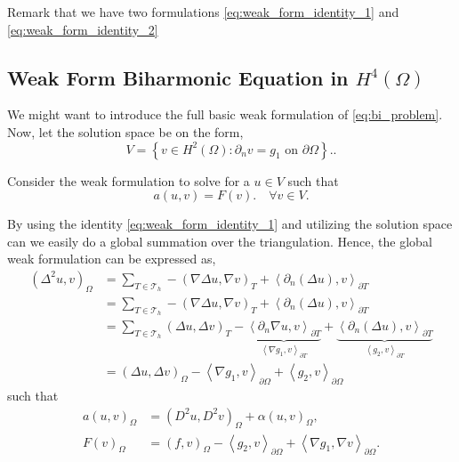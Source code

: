 Remark that we have two formulations \eqref{eq:weak_form_identity_1} and \eqref{eq:weak_form_identity_2}
\subsection{  Weak Form Biharmonic Equation in $H^{4}\left( \Omega  \right) $}%
\label{sub:continious_weak_form_of_biharmonic_equation}

We might want to introduce the full basic weak formulation of \eqref{eq:bi_problem}. Now, let the solution space be on the form,
\begin{equation*}
V = \left\{ v \in H^2\left( \Omega  \right) : \partial _{n} v = g_{1}  \text{ on }
\partial \Omega  \right\}.
.\end{equation*}

Consider the weak formulation to solve for a $u \in  V$ such that
\begin{equation}
    \label{eq:bi_weak1}
a\left( u,v \right) = F(v).\quad \forall v \in
V.
\end{equation}

By using the identity \eqref{eq:weak_form_identity_1} and utilizing the solution space can we easily do a global summation over the triangulation. Hence, the global weak formulation can be expressed as,
\[
    \begin{split}
\left( \Delta ^2 u, v \right) _{\Omega }  &= \sum_{T \in \mathcal{T} _{h}}^{}  - \left( \nabla  \Delta  u , \nabla v   \right)_{T } + \left<\partial _{n} ( \Delta u ),  v \right>_{\partial T } \\
& = \sum_{T \in \mathcal{T} _{h}}^{} - \left( \nabla  \Delta  u , \nabla v   \right)_{T } + \left<\partial _{n} ( \Delta u ),  v \right>_{\partial T } \\
&= \sum_{T \in \mathcal{T} _{h}}^{}  \left( \Delta u, \Delta v \right)_{T } - \underbrace{\left< \partial _{n} \nabla u,v  \right>_{\partial T }}_{\left< \nabla g_{1},v \right> _{\partial T } }  +  \underbrace{\left<\partial _{n} ( \Delta u ) ,  v
\right>_{\partial T }} _{\left<g_2 ,v \right>_{\partial T } } \\
&=   \left( \Delta u, \Delta v \right)_{\Omega  } - \left< \nabla g_{1},v \right> _{\partial \Omega  }   +  \left<g_2 ,v \right>_{\partial \Omega  }
    \end{split}
\]
such that
\[
    \begin{split}
a\left( u,v \right)_{\Omega } & =    \left( D ^2 u , D ^2 v\right)_{\Omega }  +
\alpha \left( u, v \right)_{\Omega }  , \\
F\left( v \right)_{\Omega } & = \left( f,v \right)_{\Omega } - \left<g_{2},v \right>_{\partial \Omega } + \left<\nabla g_{1}, \nabla v \right>_{\partial \Omega }.
    \end{split}
\]

